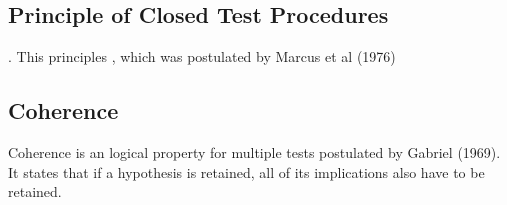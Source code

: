 \documentclass{article}
\begin{document}
\subsection*{Principle of Closed Test Procedures}.
This principles , which was postulated by Marcus et al (1976)

\subsection*{Coherence}
Coherence is an logical property for multiple tests postulated by
Gabriel (1969). It states that if a hypothesis is retained, all of
its implications also have to be retained.
\end{document}
